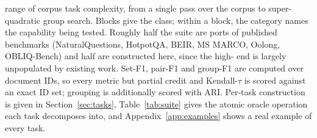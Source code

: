 \begin{table}[t]
{range of corpus task complexity, from a single pass over the corpus to super-quadratic group search.
Blocks give the \cname{} class; within a block, the category names the capability being tested.
Roughly half the suite are ports of published benchmarks (NaturalQuestions, HotpotQA, BEIR,
MS MARCO, Oolong, OBLIQ-Bench) and half are constructed here, since the high-\cname{} end is
largely unpopulated by existing work. Set-F1, pair-F1 and group-F1 are computed over document IDs,
so every metric but partial credit and Kendall-$\tau$ is scored against an exact ID set; grouping is
additionally scored with ARI. Per-task construction is given in Section~\ref{sec:tasks},
Table~\ref{tab:suite} gives the atomic oracle operation each task decomposes into, and
Appendix~\ref{app:examples} shows a real example of every task.}
\label{tab:eval-datasets}
\end{table}
